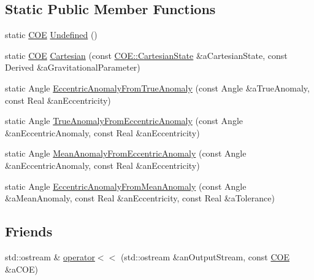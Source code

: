 \subsection*{Static Public Member Functions}
\begin{DoxyCompactItemize}
\item 
static \hyperlink{classlibrary_1_1astro_1_1trajectory_1_1orbit_1_1models_1_1kepler_1_1_c_o_e}{C\+OE} \hyperlink{classlibrary_1_1astro_1_1trajectory_1_1orbit_1_1models_1_1kepler_1_1_c_o_e_a80eee9ea122d64e648ad400d5f7b8da2}{Undefined} ()
\item 
static \hyperlink{classlibrary_1_1astro_1_1trajectory_1_1orbit_1_1models_1_1kepler_1_1_c_o_e}{C\+OE} \hyperlink{classlibrary_1_1astro_1_1trajectory_1_1orbit_1_1models_1_1kepler_1_1_c_o_e_a776a2b7587c3505cf1e063a338c4a5c6}{Cartesian} (const \hyperlink{classlibrary_1_1astro_1_1trajectory_1_1orbit_1_1models_1_1kepler_1_1_c_o_e_ac51b1d86203092966abcebb32f312ff4}{C\+O\+E\+::\+Cartesian\+State} \&a\+Cartesian\+State, const Derived \&a\+Gravitational\+Parameter)
\item 
static Angle \hyperlink{classlibrary_1_1astro_1_1trajectory_1_1orbit_1_1models_1_1kepler_1_1_c_o_e_a2302b624eb7ae3111071fd8121cd9d46}{Eccentric\+Anomaly\+From\+True\+Anomaly} (const Angle \&a\+True\+Anomaly, const Real \&an\+Eccentricity)
\item 
static Angle \hyperlink{classlibrary_1_1astro_1_1trajectory_1_1orbit_1_1models_1_1kepler_1_1_c_o_e_ad1d42a117d9c2178cc8873aeae704f21}{True\+Anomaly\+From\+Eccentric\+Anomaly} (const Angle \&an\+Eccentric\+Anomaly, const Real \&an\+Eccentricity)
\item 
static Angle \hyperlink{classlibrary_1_1astro_1_1trajectory_1_1orbit_1_1models_1_1kepler_1_1_c_o_e_af132bc9fffbc07a9c1a5c5465f2671d7}{Mean\+Anomaly\+From\+Eccentric\+Anomaly} (const Angle \&an\+Eccentric\+Anomaly, const Real \&an\+Eccentricity)
\item 
static Angle \hyperlink{classlibrary_1_1astro_1_1trajectory_1_1orbit_1_1models_1_1kepler_1_1_c_o_e_a41443d444243ac50153e8a1a13e115d6}{Eccentric\+Anomaly\+From\+Mean\+Anomaly} (const Angle \&a\+Mean\+Anomaly, const Real \&an\+Eccentricity, const Real \&a\+Tolerance)
\end{DoxyCompactItemize}
\subsection*{Friends}
\begin{DoxyCompactItemize}
\item 
std\+::ostream \& \hyperlink{classlibrary_1_1astro_1_1trajectory_1_1orbit_1_1models_1_1kepler_1_1_c_o_e_a32e0ab4a9a11b3315114f2932c58f68c}{operator$<$$<$} (std\+::ostream \&an\+Output\+Stream, const \hyperlink{classlibrary_1_1astro_1_1trajectory_1_1orbit_1_1models_1_1kepler_1_1_c_o_e}{C\+OE} \&a\+C\+OE)
\end{DoxyCompactItemize}



